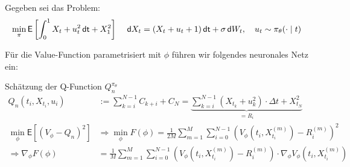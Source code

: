 \documentclass[a4paper, 12pt]{scrartcl}
\newcommand{\dt}{\thinspace \mathsf{dt}}
\newcommand{\dW}{\thinspace \mathsf{d}W}
\newcommand{\dX}{\thinspace \mathsf{d}X}
\begin{document}
\begin{beispiel} 
    Gegeben sei das Problem: 
    \begin{align*}
        \min_{\pi} \mathsf{E}
        \left[
            \int_0^1 X_t +u_t^2  \dt + X_1^2  
        \right]
        \quad 
        \dX_t = (X_t + u_t + 1) \dt + \sigma \dW_t, 
        \quad 
        u_t \sim \pi_{\theta}(\cdot \mid t)
    \end{align*}

    Für die Value-Function parametrisiert mit $\phi$ 
    führen wir folgendes neuronales Netz ein:

    Schätzung der Q-Function $Q_{n}^{\pi_{\theta}}$
        \begin{align*}
            Q_n(t_i , X_{t_i}, u_i) 
            &:=
            \sum_{k=i}^{N-1}
            C_{k+i}
            +
            C_N
            =
            \underbrace{
                \sum_{k=i}^{N-1}
                (X_{t_{k}} + u_{k}^2)
                \cdot \Delta t
                +
                X_{t_N}^2
            }_{= R_i}
            \\
            \min_{\phi}
            \mathsf{E}
            \left[
                \left(
                    V_{\phi}
                    -
                    Q_n
                \right)^2
            \right]
            &\Rightarrow
            \min_{\phi}
            F(\phi)
            =
            \frac{1}{2M}
            \sum_{m=1}^{M}
            \sum_{i=0}^{N-1} (
                V_{\phi}(t_i , X_{t_i}^{(m)})
                -
                R_i^{(m)}
            )^2
            \\
            \Rightarrow
            \nabla_{\phi} F(\phi)
            &=
            \frac{1}{M}
            \sum_{m=1}^{M}
            \sum_{i=0}^{N-1}
            \left(
                V_{\phi}(t_i , X_{t_i}^{(m)})
                -
                R_i^{(m)}
            \right)
            \cdot
            \nabla_{\phi} V_{\phi}(t_i , X_{t_i}^{(m)})
        \end{align*}
\end{beispiel}
%
\end{document}
